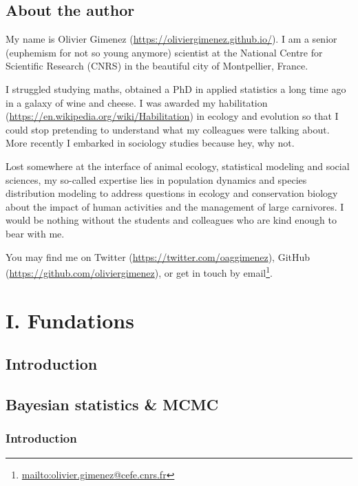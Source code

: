 \documentclass[
  12pt,
]{krantz}
\renewcommand{\href}[2]{#2\footnote{\url{#1}}}
\begin{document}
\hypertarget{about-the-author}{%
\chapter*{About the author}\label{about-the-author}}


My name is Olivier Gimenez (\url{https://oliviergimenez.github.io/}). I am a senior (euphemism for not so young anymore) scientist at the National Centre for Scientific Research (CNRS) in the beautiful city of Montpellier, France.

I struggled studying maths, obtained a PhD in applied statistics a long time ago in a galaxy of wine and cheese. I was awarded my habilitation (\url{https://en.wikipedia.org/wiki/Habilitation}) in ecology and evolution so that I could stop pretending to understand what my colleagues were talking about. More recently I embarked in sociology studies because hey, why not.

Lost somewhere at the interface of animal ecology, statistical modeling and social sciences, my so-called expertise lies in population dynamics and species distribution modeling to address questions in ecology and conservation biology about the impact of human activities and the management of large carnivores. I would be nothing without the students and colleagues who are kind enough to bear with me.

You may find me on Twitter (\url{https://twitter.com/oaggimenez}), GitHub (\url{https://github.com/oliviergimenez}), or get in touch \href{mailto:olivier.gimenez@cefe.cnrs.fr}{by email}.

\mainmatter

\hypertarget{part-i.-fundations}{%
\part{I. Fundations}\label{part-i.-fundations}}

\hypertarget{introduction}{%
\chapter*{Introduction}\label{introduction}}


\hypertarget{crashcourse}{%
\chapter{Bayesian statistics \& MCMC}\label{crashcourse}}

\hypertarget{introduction-1}{%
\section{Introduction}\label{introduction-1}}
\end{document}
